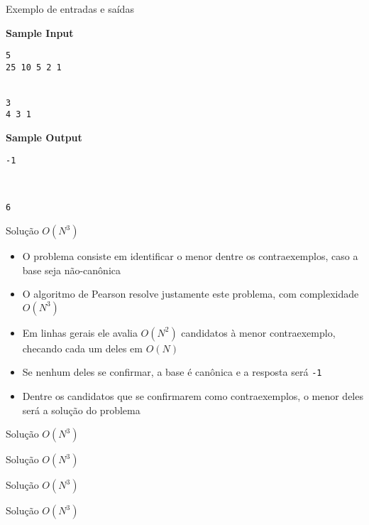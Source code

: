 \begin{frame}[fragile]{Exemplo de entradas e saídas}

\begin{minipage}[t]{0.45\textwidth}
\textbf{Sample Input}
\begin{verbatim}
5
25 10 5 2 1


3
4 3 1
\end{verbatim}
\end{minipage}
\begin{minipage}[t]{0.5\textwidth}
\textbf{Sample Output}
\begin{verbatim}
-1



6
\end{verbatim}
\end{minipage}
\end{frame}

\begin{frame}[fragile]{Solução $O(N^3)$}

    \begin{itemize}
        \item O problema consiste em identificar o menor dentre os contraexemplos, caso a base
            seja não-canônica

        \item O algoritmo de Pearson resolve justamente este problema, com complexidade $O(N^3)$

        \item Em linhas gerais ele avalia $O(N^2)$ candidatos à menor contraexemplo, checando 
            cada um deles em $O(N)$

        \item Se nenhum deles se confirmar, a base é canônica e a resposta será \texttt{-1}

        \item Dentre os candidatos que se confirmarem como contraexemplos, o menor deles será
            a solução do problema
   \end{itemize}

\end{frame}

\begin{frame}[fragile]{Solução $O(N^3)$}
\end{frame}

\begin{frame}[fragile]{Solução $O(N^3)$}
\end{frame}

\begin{frame}[fragile]{Solução $O(N^3)$}
\end{frame}

\begin{frame}[fragile]{Solução $O(N^3)$}
\end{frame}
